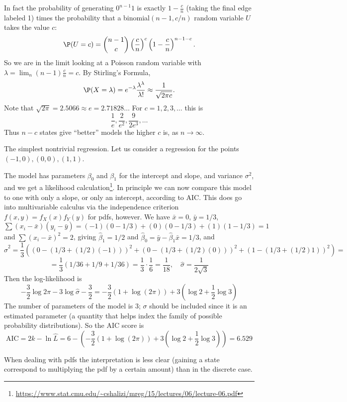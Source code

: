 		In fact the probability of generating $0^{n-1}1$ is exactly $1-\frac{c}n$ (taking the final edge labeled 1) times the probability that a binomial$(n-1,c/n)$ random variable $U$ takes the value $c$:
		\[
			\P(U=c) = \binom{n-1}c \left(\frac{c}n\right)^{c}\left(1-\frac{c}n\right)^{n-1-c}.
		\]
		So we are in the limit looking at a Poisson random variable with $\lambda=\lim_n (n-1)\frac{c}n=c$. By Stirling's Formula,
		\[
			\P(X=\lambda) = e^{-\lambda}\frac{\lambda^\lambda}{\lambda!} \approx \frac1{\sqrt{2\pi c}}.
		\]
		Note that $\sqrt{2\pi}=2.5066\approx e=2.71828\dots$
		For $c=1,2,3,\dots$ this is
		\[
			\frac1e, \frac2{e^2}, \frac{9}{2e^3},\dots
		\]
		Thus $n-c$ states give ``better'' models the higher $c$ is, as $n\to\infty$.
	\begin{example}{The simplest nontrivial regression.}\label{favExa}
		Let us consider a regression for the points $(-1,0), (0,0), (1,1)$.


		The model has parameters $\beta_0$ and $\beta_1$ for the intercept and slope, and variance $\sigma^2$,
		and we get a likelihood calculation\footnote{\url{https://www.stat.cmu.edu/~cshalizi/mreg/15/lectures/06/lecture-06.pdf}}.
		In principle we can now compare this model to one with only a slope, or only an intercept, according to AIC.
		This does go into multivariable calculus via the independence criterion $f(x,y)=f_X(x)f_Y(y)$ for pdfs, however.
		We have $\bar x=0$, $\bar y=1/3$, $\sum (x_i-\bar x)(y_i-\bar y)=(-1)(0-1/3)+(0)(0-1/3)+(1)(1-1/3)=1$ and $\sum (x_i-\bar x)^2=2$, giving $\hat\beta_1=1/2$ and $\hat\beta_0=\bar y-\hat\beta_1\bar x = 1/3$, and
		\[
			\hat\sigma^2=\frac13((0-(1/3+(1/2)(-1)))^2+(0-(1/3+(1/2)(0)))^2 + (1-(1/3+(1/2)1))^2)=
		\]
		\[
						=\frac13(1/36 + 1/9 + 1/36) = \frac13 \cdot \frac16 = \frac1{18},\quad \hat\sigma=\frac1{2\sqrt{3}}
		\]
		Then the log-likelihood is
		\[
			-\frac32\log 2\pi - 3\log \hat\sigma - \frac{3}{2} = -\frac32(1+\log(2\pi)) + 3(\log 2 + \frac12\log 3)
		\]
		The number of parameters of the model is 3; $\sigma$ should be included since it is an estimated parameter (a quantity that helps index the family of possible probability distributions). So the AIC score is
		\[
			\mathrm{AIC} = 2k - \ln \hat L = 6 - (-\frac32(1+\log(2\pi)) + 3(\log 2 + \frac12\log 3)) = 6.529
		\]
	\end{example}
		When dealing with pdfs the interpretation is less clear (gaining a state correspond to multiplying the pdf by a certain amount) than in the discrete case.
